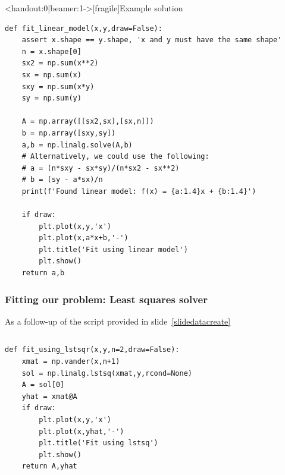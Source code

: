 \begin{frame}<handout:0|beamer:1->[fragile]{Example solution}
    \begin{lstlisting}
def fit_linear_model(x,y,draw=False):
    assert x.shape == y.shape, 'x and y must have the same shape'
    n = x.shape[0]
    sx2 = np.sum(x**2)
    sx = np.sum(x)
    sxy = np.sum(x*y)
    sy = np.sum(y)

    A = np.array([[sx2,sx],[sx,n]])
    b = np.array([sxy,sy])
    a,b = np.linalg.solve(A,b)
    # Alternatively, we could use the following:
    # a = (n*sxy - sx*sy)/(n*sx2 - sx**2)
    # b = (sy - a*sx)/n
    print(f'Found linear model: f(x) = {a:1.4}x + {b:1.4}')
    
    if draw:
        plt.plot(x,y,'x')
        plt.plot(x,a*x+b,'-')
        plt.title('Fit using linear model')
        plt.show()
    return a,b
    \end{lstlisting}
\end{frame}



\begin{frame}[fragile] 
  \frametitle{Fitting our problem: Least squares solver}
  As a follow-up of the script provided in slide~\ref{slidedatacreate}
  \begin{columns}[T]
    \begin{lstlisting}
def fit_using_lstsqr(x,y,n=2,draw=False):
    xmat = np.vander(x,n+1)
    sol = np.linalg.lstsq(xmat,y,rcond=None)
    A = sol[0]
    yhat = xmat@A
    if draw:
        plt.plot(x,y,'x')
        plt.plot(x,yhat,'-')
        plt.title('Fit using lstsq')
        plt.show()
    return A,yhat
    \end{lstlisting}
      
  \end{columns}
\end{frame}


